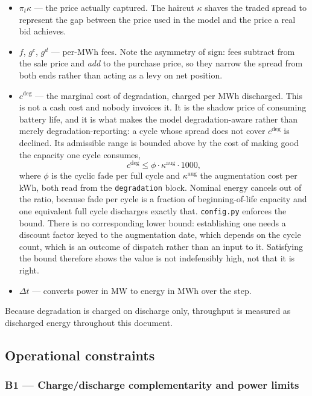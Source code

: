 \documentclass[11pt,a4paper]{article}
\numberwithin{equation}{section}
\begin{document}
\begin{itemize}
  \item $\pi_t \kappa$ --- the price actually captured. The haircut $\kappa$
        shaves the traded spread to represent the gap between the price used in
        the model and the price a real bid achieves.
  \item $f$, $g^{c}$, $g^{d}$ --- per-MWh fees. Note the asymmetry of sign: fees
        subtract from the sale price and \emph{add} to the purchase price, so
        they narrow the spread from both ends rather than acting as a levy on
        net position.
  \item $c^{\deg}$ --- the marginal cost of degradation, charged per MWh
        discharged. This is not a cash cost and nobody invoices it. It is the
        shadow price of consuming battery life, and it is what makes the model
        degradation-aware rather than merely degradation-reporting: a cycle
        whose spread does not cover $c^{\deg}$ is declined. Its admissible
        range is bounded above by the cost of making good the capacity one
        cycle consumes,
        \[
          c^{\deg} \le \phi \cdot \kappa^{\text{aug}} \cdot 1000 ,
        \]
        where $\phi$ is the cyclic fade per full cycle and
        $\kappa^{\text{aug}}$ the augmentation cost per kWh, both read from the
        \nolinkurl{degradation} block. Nominal energy
        cancels out of the ratio, because fade per cycle is a fraction of
        beginning-of-life capacity and one equivalent full cycle discharges
        exactly that. \nolinkurl{config.py} enforces the bound. There is no
        corresponding lower bound: establishing one needs a discount factor
        keyed to the augmentation date, which depends on the cycle count, which
        is an outcome of dispatch rather than an input to it. Satisfying the
        bound therefore shows the value is not indefensibly high, not that it is
        right.
  \item $\Delta t$ --- converts power in MW to energy in MWh over the step.
\end{itemize}

Because degradation is charged on discharge only, throughput is measured as
discharged energy throughout this document.

\subsection{Operational constraints}

\subsubsection*{B1 --- Charge/discharge complementarity and power limits}
\end{document}
